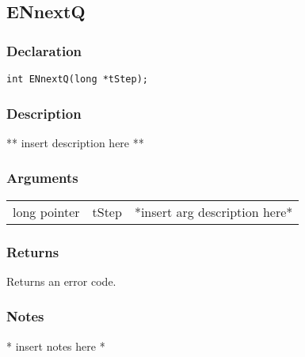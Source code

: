 \subsection{ENnextQ}
\subsubsection{Declaration}
\begin{lstlisting}
int ENnextQ(long *tStep);
\end{lstlisting}
\subsubsection{Description}
** insert description here **
\subsubsection{Arguments}
\begin{tabular}{l r p{11cm} }
long pointer&tStep&*insert arg description here* \\[6pt]
\end{tabular}
\subsubsection{Returns}
Returns an error code.
\subsubsection{Notes}
* insert notes here *